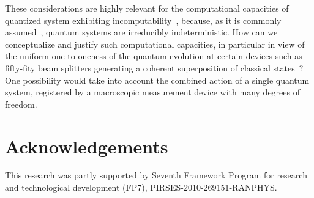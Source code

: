\documentclass[runningheads]{llncs}
\begin{document}
These considerations are highly relevant for the computational capacities of quantized system exhibiting
incomputability~\cite{2008-cal-svo},
because, as it is commonly assumed~\cite{zeil-05_nature_ofQuantum},
quantum systems are irreducibly indeterministic.
How can we conceptualize and justify such computational capacities,
in particular in view of the uniform one-to-oneness of the quantum evolution at certain devices such
as fifty-fity beam splitters generating a coherent superposition of classical states~\cite{schroedinger-interpretation}?
One possibility would take into account the combined
action of a single quantum system, registered by a macroscopic measurement device with many degrees of freedom.

\section*{Acknowledgements}
This research was partly supported by Seventh Framework Program for research and technological development (FP7), PIRSES-2010-269151-RANPHYS.

%
%
\end{document}
